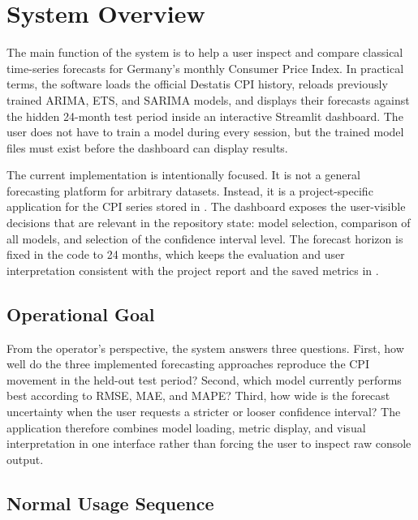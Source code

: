 %
%

\chapter{System Overview}
\label{ch:mainfunction}

The main function of the system is to help a user inspect and compare classical time-series forecasts for Germany's monthly Consumer Price Index. In practical terms, the software loads the official Destatis CPI history, reloads previously trained ARIMA, ETS, and SARIMA models, and displays their forecasts against the hidden 24-month test period inside an interactive Streamlit dashboard. The user does not have to train a model during every session, but the trained model files must exist before the dashboard can display results.

The current implementation is intentionally focused. It is not a general forecasting platform for arbitrary datasets. Instead, it is a project-specific application for the CPI series stored in . The dashboard exposes the user-visible decisions that are relevant in the repository state: model selection, comparison of all models, and selection of the confidence interval level. The forecast horizon is fixed in the code to 24 months, which keeps the evaluation and user interpretation consistent with the project report and the saved metrics in .

\section{Operational Goal}

From the operator's perspective, the system answers three questions. First, how well do the three implemented forecasting approaches reproduce the CPI movement in the held-out test period? Second, which model currently performs best according to RMSE, MAE, and MAPE? Third, how wide is the forecast uncertainty when the user requests a stricter or looser confidence interval? The application therefore combines model loading, metric display, and visual interpretation in one interface rather than forcing the user to inspect raw console output.

\section{Normal Usage Sequence}

